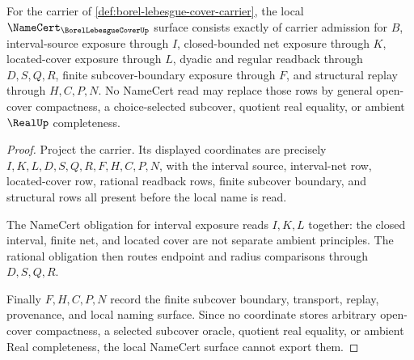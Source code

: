 \begin{theorem}
\label{thm:borel-lebesgue-cover-namecert-obligations}
For the carrier of \autoref{def:borel-lebesgue-cover-carrier}, the local
$\NameCert_{\BorelLebesgueCoverUp}$ surface consists exactly of carrier
admission for $B$, interval-source exposure through $I$, closed-bounded net
exposure through $K$, located-cover exposure through $L$, dyadic and regular
readback through $D,S,Q,R$, finite subcover-boundary exposure through $F$, and
structural replay through $H,C,P,N$. No NameCert read may replace those rows by
general open-cover compactness, a choice-selected subcover, quotient real
equality, or ambient $\RealUp$ completeness.
\end{theorem}
\begin{proof}
Project the carrier. Its displayed coordinates are precisely
$I,K,L,D,S,Q,R,F,H,C,P,N$, with the interval source, interval-net row,
located-cover row, rational readback rows, finite subcover boundary, and
structural rows all present before the local name is read.

The NameCert obligation for interval exposure reads $I,K,L$ together: the
closed interval, finite net, and located cover are not separate ambient
principles. The rational obligation then routes endpoint and radius comparisons
through $D,S,Q,R$.

Finally $F,H,C,P,N$ record the finite subcover boundary, transport, replay,
provenance, and local naming surface. Since no coordinate stores arbitrary
open-cover compactness, a selected subcover oracle, quotient real equality, or
ambient Real completeness, the local NameCert surface cannot export them.
\end{proof}


